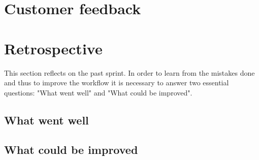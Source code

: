 \section{Customer feedback}
\section{Retrospective}
This section reflects on the past sprint. In order to learn from the mistakes done and thus to improve the workflow it is necessary to answer two essential questions: "What went well" and "What could be improved".

\subsection{What went well}
\subsection{What could be improved}
